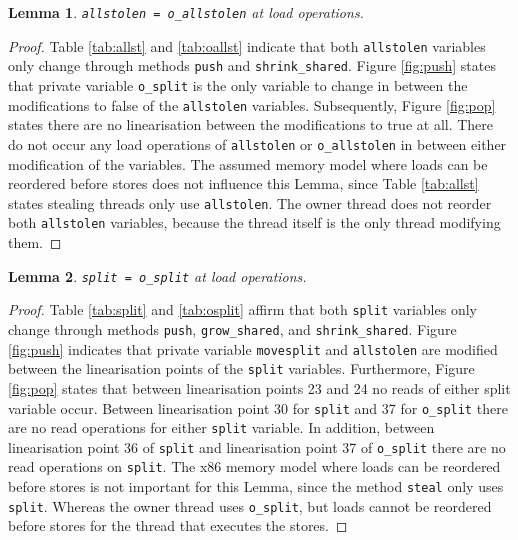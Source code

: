 \documentclass{sig-alternate-br}
\newtheorem{lemma}{Lemma}
\begin{document}
\begin{lemma}
	\texttt{allstolen = o\_allstolen} at load operations.
	\label{lem:allstolen}
\end{lemma}
\begin{proof}
	Table \ref{tab:allst} and \ref{tab:oallst} indicate that both \texttt{allstolen} variables only change through methods \texttt{push} and \texttt{shrink\_shared}.
	Figure \ref{fig:push} states that private variable \texttt{o\_split} is the only variable to change in between the modifications to false of the \texttt{allstolen} variables.
	Subsequently, Figure \ref{fig:pop} states there are no linearisation between the modifications to true at all.
	There do not occur any load operations of \texttt{allstolen} or \texttt{o\_allstolen} in between either modification of the variables.
	The assumed memory model where loads can be reordered before stores does not influence this Lemma, since Table \ref{tab:allst} states stealing threads only use \texttt{allstolen}.
	The owner thread does not reorder both \texttt{allstolen} variables, because the thread itself is the only thread modifying them.
\end{proof}

\begin{lemma}
	\texttt{split = o\_split} at load operations.
	\label{lem:split}
\end{lemma}
\begin{proof}
	Table \ref{tab:split} and \ref{tab:osplit} affirm that both \texttt{split} variables only change through methods \texttt{push}, \texttt{grow\_shared}, and \texttt{shrink\_shared}.
	Figure \ref{fig:push} indicates that private variable \texttt{movesplit} and \texttt{allstolen} are modified between the linearisation points of the \texttt{split} variables.
	Furthermore, Figure \ref{fig:pop} states that between linearisation points 23 and 24 no reads of either split variable occur.
	Between linearisation point 30 for \texttt{split} and 37 for \texttt{o\_split} there are no read operations for either \texttt{split} variable.
	In addition, between linearisation point 36 of \texttt{split} and linearisation point 37 of \texttt{o\_split} there are no read operations on \texttt{split}.	
	The x86 memory model where loads can be reordered before stores is not important for this Lemma, since the method \texttt{steal} only uses \texttt{split}.
	Whereas the owner thread uses \texttt{o\_split}, but loads cannot be reordered before stores for the thread that executes the stores.		
\end{proof}
\end{document}
